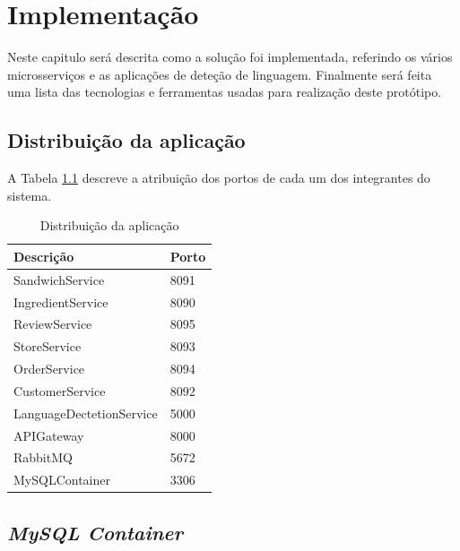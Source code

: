 \chapter{Implementação}	%
\label{Chapter6}

Neste capitulo será descrita como a solução foi implementada, referindo os vários microsserviços e as aplicações de deteção de linguagem. Finalmente será feita uma lista das tecnologias e ferramentas usadas para realização deste protótipo.


\section{Distribuição da aplicação}
A Tabela \ref{table:distribuicaoAplicacao} descreve a atribuição dos portos de cada um dos integrantes do sistema. 

\begin{table}[H]
\caption{Distribuição da aplicação}
\label{table:distribuicaoAplicacao}
\begin{center}
\begin{tabular}{ |p{5cm}|p{5cm}|  }
\hline
\textbf{Descrição} & \textbf{Porto} \\
\hline
SandwichService & 8091\\
\hline
IngredientService &  8090\\
\hline
ReviewService &  8095\\
\hline
StoreService &  8093\\
\hline
OrderService &  8094\\
\hline
CustomerService &  8092\\
\hline
LanguageDectetionService &  5000\\
\hline
APIGateway &  8000\\
\hline
RabbitMQ &  5672\\
\hline
MySQLContainer & 3306\\
\hline
\end{tabular} 
\end{center}
\end{table}

\section{\textit{MySQL Container}}

